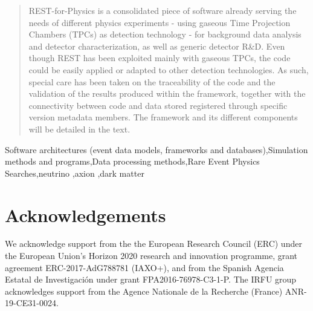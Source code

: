 \documentclass[article]{elsarticle}
\begin{document}
\begin{frontmatter}
\begin{abstract}
REST-for-Physics is a consolidated piece of software already serving the needs of different physics experiments - using  gaseous Time Projection Chambers (TPCs) as detection technology - for background data analysis and detector characterization, as well as generic detector R\&D. Even though REST has been exploited mainly with gaseous TPCs, the code could be easily applied or adapted to other detection technologies. As such, special care has been taken on the traceability of the code and the validation of the results produced within the framework, together with the connectivity between code and data stored registered through specific version metadata members. The framework and its different components will be detailed in the text.


\end{abstract}

\begin{keyword}
Software architectures (event data models, frameworks and databases)\sep Simulation methods and programs\sep Data processing methods\sep Rare Event Physics Searches\sep neutrino \sep axion \sep dark matter
\end{keyword}

\end{frontmatter}

\linenumbers






\section*{Acknowledgements}
We acknowledge support from the the European Research Council (ERC) under the European Union’s Horizon 2020 research and innovation programme, grant agreement ERC-2017-AdG788781 (IAXO+), and from the Spanish Agencia Estatal de Investigaci\'on under grant FPA2016-76978-C3-1-P. The IRFU group acknowledges support from the Agence Nationale de la Recherche (France) ANR-19-CE31-0024.

  \centering


\end{document}
